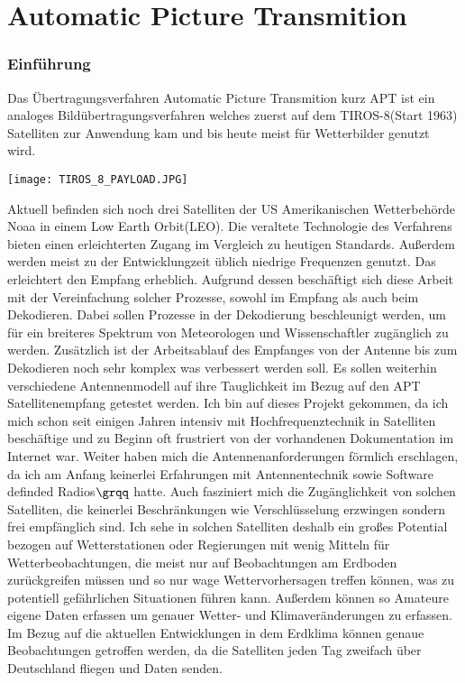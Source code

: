 \part{\glqq Automatic Picture Transmition\grqq}
\section[Charakteristiken]{Einführung}
\begin{multicols}{2}

    Das Übertragungsverfahren \glqq Automatic Picture Transmition \grqq kurz APT ist ein analoges Bildübertragungsverfahren welches zuerst auf dem TIROS-8(Start 1963) Satelliten zur Anwendung kam und bis heute meist für Wetterbilder genutzt wird. 
    \begin{center}
        \centering
        \texttt{[image: TIROS\_8\_PAYLOAD.JPG]}
    \end{center}
    Aktuell befinden sich noch drei Satelliten der US Amerikanischen Wetterbehörde Noaa in einem \glqq Low Earth Orbit\grqq(LEO). Die veraltete Technologie des Verfahrens bieten einen erleichterten Zugang im Vergleich zu heutigen Standards. Außerdem werden meist zu der Entwicklungzeit üblich niedrige Frequenzen genutzt. Das erleichtert den Empfang erheblich. Aufgrund dessen beschäftigt sich diese Arbeit mit der Vereinfachung solcher Prozesse, sowohl im Empfang als auch beim Dekodieren. Dabei sollen Prozesse in der Dekodierung beschleunigt werden, um für ein breiteres Spektrum von Meteorologen und Wissenschaftler zugänglich zu werden. Zusätzlich ist der Arbeitsablauf des Empfanges von der Antenne bis zum Dekodieren noch sehr komplex was verbessert werden soll. Es sollen weiterhin verschiedene Antennenmodell auf ihre Tauglichkeit im Bezug auf den APT Satellitenempfang getestet werden. Ich bin auf dieses Projekt gekommen, da ich mich schon seit einigen Jahren intensiv mit Hochfrequenztechnik in Satelliten beschäftige und zu Beginn oft frustriert von der vorhandenen Dokumentation im Internet war. Weiter haben mich die Antennenanforderungen förmlich erschlagen, da ich am Anfang keinerlei Erfahrungen mit Antennentechnik sowie \glqq Software definded Radios\( \grqq \) hatte. Auch fasziniert mich die Zugänglichkeit von solchen Satelliten, die keinerlei Beschränkungen wie Verschlüsselung erzwingen sondern frei empfänglich sind. Ich sehe in solchen Satelliten deshalb ein großes Potential bezogen auf Wetterstationen oder Regierungen mit wenig Mitteln für Wetterbeobachtungen, die meist nur auf Beobachtungen am Erdboden zurückgreifen müssen und so nur wage Wettervorhersagen treffen können, was zu potentiell gefährlichen Situationen führen kann. Außerdem können so Amateure eigene Daten erfassen um genauer Wetter- und Klimaveränderungen zu erfassen. Im Bezug auf die aktuellen Entwicklungen in dem Erdklima können genaue Beobachtungen getroffen werden, da die Satelliten jeden Tag zweifach über Deutschland fliegen und Daten senden.
    \newpage

\end{multicols}
